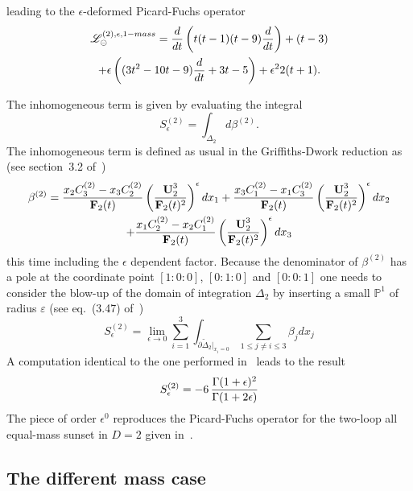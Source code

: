 \documentclass[a4paper,12pt]{article}
\numberwithin{equation}{section}
\numberwithin{figure}{section}
\def\su{\circleddash}
\begin{document}
leading to the $\epsilon$-deformed Picard-Fuchs operator
\begin{multline}
  \label{e:PF2sunset1massepsilon}
     \mathscr{L}^{(2),\epsilon,1-mass}_\su ={d\over dt}\left( t(t-1)(t-9)
       {d\over dt}\right)+(t-3)\cr+\epsilon\left((3t^2-10t-9) {d\over
         dt}+3t-5\right)
     +\epsilon^2 2(t+1).
\end{multline}
%



The inhomogeneous term is given by evaluating the integral 
\begin{equation}
  S_\epsilon^{(2)}=\int_{\Delta_2} d\beta^{(2)} .
\end{equation}
The inhomogeneous term is defined as usual in the Griffiths-Dwork
reduction as (see section~3.2 of~\cite{Bloch:2016izu})
\begin{multline}
  \beta^{(2)}= {x_2 C_3^{(2)} -x_3 C_2^{(2)}\over \textbf{F}_2(t)}
  \left(\textbf{U}_2^3\over \textbf{F}_2(t)^2\right)^\epsilon  dx_1
  + {x_3 C_1^{(2)} -x_1 C_3^{(2)}\over \textbf{F}_2(t)}
  \left(\textbf{U}_2^3\over \textbf{F}_2(t)^2\right)^\epsilon  dx_2\cr+ {x_1 C_2^{(2)} -x_2 C_1^{(2)}\over \textbf{F}_2(t)}
  \left(\textbf{U}_2^3\over \textbf{F}_2(t)^2\right)^\epsilon  dx_3
\end{multline}
this time including the $\epsilon$ dependent factor. 
Because the denominator of $\beta^{(2)}$ has a pole at the coordinate
point $[1:0:0]$, $[0:1:0]$ and $[0:0:1]$ one needs to consider the
blow-up  of the domain of integration $\Delta_2$ by inserting a small
$\mathbb P^1$ of radius $\varepsilon$ (see eq.~(3.47) of~\cite{Bloch:2016izu})
\begin{equation}
    S_\epsilon^{(2)}=\lim_{\epsilon\to0} \sum_{i=1}^3
    \int_{\partial\tilde\Delta_2|_{x_i=0}} \sum_{1\leq j\neq i\leq 3}
    \beta_j dx_j
\end{equation}
A computation identical to the one performed in~\cite{Bloch:2016izu} leads to
the result
\begin{equation}
  S_\epsilon^{(2)}=  -6 \, {\Gamma(1+\epsilon)^2\over \Gamma(1+2\epsilon)}
\end{equation}
The piece of order $\epsilon^0$ reproduces the Picard-Fuchs operator
for the two-loop all equal-mass sunset in $D=2$ given
in~\cite{Bloch:2013tra,Bloch:2013tra,Vanhove:2014wqa,Bonisch:2020qmm,Pogel:2022vat}.

\subsection{The different mass case}\label{sec:2sunset3mass}
\end{document}
